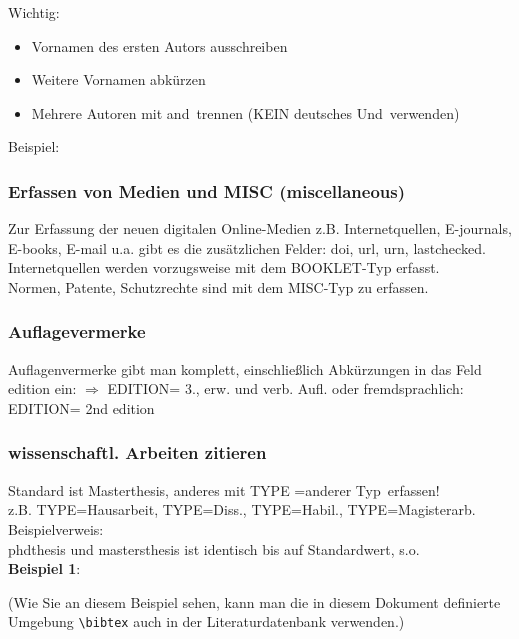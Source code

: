 \documentclass[xlevel, hyperref, nat, mp]{wise}
\newcommand\code[1]{\texttt{#1}}
\newcommand\command[1]{\code{\textbackslash{}#1}}
\newcommand{\gr}{\grqq \ }
\begin{document}
Wichtig: 

\begin{itemize}
\item Vornamen des ersten Autors ausschreiben 
\item Weitere Vornamen abkürzen 
\item Mehrere Autoren mit \glqq and\gr trennen (KEIN deutsches \glqq Und\gr verwenden) 
\end{itemize}

Beispiel: \\
\cite{mittelbach05}

\subsubsection{Erfassen von Medien und MISC (miscellaneous)}

Zur Erfassung der neuen digitalen Online-Medien z.B. Internetquellen, E-journals, E-books, E-mail u.a. gibt es die zusätzlichen Felder: doi, url, urn, lastchecked.\\ Internetquellen werden vorzugsweise mit dem BOOKLET-Typ erfasst. \\
Normen, Patente, Schutzrechte sind mit dem MISC-Typ zu erfassen.

\subsubsection{Auflagevermerke}
Auflagenvermerke gibt man komplett, einschließlich Abkürzungen in das Feld edition ein: $\Longrightarrow$ EDITION= { 3., erw. und verb. Aufl. }
oder fremdsprachlich:      EDITION= { 2nd edition }

\subsubsection{wissenschaftl. Arbeiten zitieren}
Standard ist Masterthesis, anderes mit TYPE =\glqq anderer Typ\grqq \ erfassen!\\
z.B. TYPE={Hausarbeit}, TYPE={Diss.}, TYPE={Habil.}, TYPE={Magisterarb.}\\
Beispielverweis: \cite{magisterarbeit}\\
phdthesis und mastersthesis ist identisch bis auf Standardwert, s.o.\\

\textbf{Beispiel 1}:
\cite{dokumentation}

(Wie Sie an diesem Beispiel sehen, kann man die in diesem Dokument definierte Umgebung \command{bibtex} auch in der Literaturdatenbank verwenden.)\\
\end{document}
